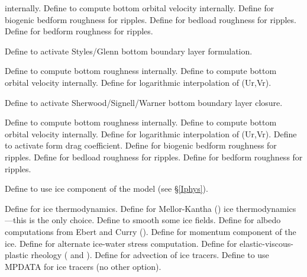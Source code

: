 \begin{klist}
\begin{klist}
\begin{klist}
      internally.
         Define to compute bottom orbital velocity
    internally.
         Define for biogenic bedform roughness for
    ripples.
         Define for bedload roughness for ripples.
         Define for bedform roughness for ripples.
      \end{klist}
       Define to activate Styles/Glenn bottom
   boundary layer formulation.
      \begin{klist}
         Define to compute bottom roughness
     internally.
         Define to compute bottom orbital velocity
    internally.
          Define for logarithmic interpolation of
     (Ur,Vr).
      \end{klist}
       Define to activate Sherwood/Signell/Warner bottom
    boundary layer closure.
      \begin{klist}
         Define to compute bottom roughness
     internally.
         Define to compute bottom orbital velocity
    internally.
          Define for logarithmic interpolation of
     (Ur,Vr).
         Define to activate form drag
     coefficient.
         Define for biogenic bedform roughness for
    ripples.
         Define for bedload roughness for ripples.
         Define for bedform roughness for ripples.
      \end{klist}
  \end{klist}
  \mbox{}
    \begin{klist}
    Define to use ice component of the model (see
    \S\ref{Iphys}).
      \begin{klist}
         Define for ice thermodynamics.
         Define for Mellor-Kantha (\cite{Mellor89})
	ice thermodynamics---this is the only choice.
	 Define to smooth some ice fields.
	 Define for albedo computations from Ebert
	and Curry (\cite{Ebert93}).
	 Define for momentum component of the ice.
	 Define for alternate ice-water stress
	computation.
	 Define for elastic-viscous-plastic rheology
	(\cite{Hunke97} and \cite{Hunke_2001}).
	 Define for advection of ice tracers.
	 Define to use MPDATA for ice tracers (no
	other option).

\end{klist}
\end{klist}
\end{klist}
